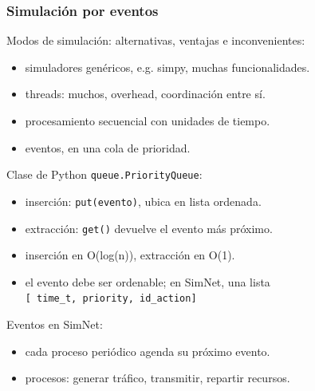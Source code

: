 \documentclass[spanish]{beamer}    %
\begin{document}
\begin{frame}
    \frametitle{Simulación por eventos}
    Modos de simulación: alternativas, ventajas e inconvenientes: 
        \begin{itemize}
            \item simuladores genéricos, e.g. simpy, muchas funcionalidades.
            \item threads: muchos, overhead, coordinación entre sí.
            \item procesamiento secuencial con unidades de tiempo.
            \item eventos, en una cola de prioridad.
        \end{itemize}
    Clase de Python \texttt{queue.PriorityQueue}:
        \begin{itemize}
            \item inserción: \texttt{put(evento)}, ubica en lista ordenada.
            \item extracción: \texttt{get()} devuelve el evento más próximo.
            \item inserción en O(log(n)), extracción en O(1).
            \item el evento debe ser ordenable; en SimNet, una lista\\
            \texttt{[ time\_t, priority, id\_action]}
        \end{itemize}
    Eventos en SimNet:
        \begin{itemize}
            \item cada proceso periódico agenda su próximo evento.
            \item procesos: generar tráfico, transmitir, repartir recursos.
        \end{itemize}
\end{frame}

\end{document}
